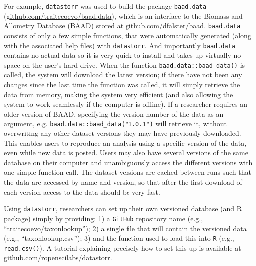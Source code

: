 \documentclass[a4paper,11pt]{article}
\newcommand{\smurl}[1]{{\footnotesize\url{#1}}}
\begin{document}
For example, \texttt{datastorr} was used to build the package \texttt{baad.data} (\smurl{github.com/traitecoevo/baad.data}), which is an interface to the Biomass and Allometry Database (\textsc{BAAD}) \citep{Falster-2015} stored at \smurl{github.com/dfalster/baad}. \texttt{baad.data} consists of only a few simple functions, that were automatically generated (along with the associated help files) with \texttt{datastorr}. And importantly \texttt{baad.data} contains no actual data so it is very quick to install and takes up virtually no space on the user's hard-drive.
When the function \texttt{baad.data::baad\_data()} is called, the system will download the latest version; if there have not been any changes since the last time the function was called, it will simply retrieve the data from memory, making the system very efficient (and also allowing the system to work seamlessly if the computer is offline). If a researcher requires an older version of \textsc{BAAD}, specifying the version number of the data as an argument, e.g. \texttt{baad.data::baad\_data("1.0.1")} will retrieve it, without overwriting any other dataset versions they may have previously downloaded. This enables users to reproduce an analysis using a specific version of the data, even while new data is posted.  Users may also have several versions of the same database on their computer and unambiguously access the different versions with one simple function call. The dataset versions are cached between runs such that the data are accessed by name and version, so that after the first download of each version access to the data should be very fast.  


Using \texttt{datastorr}, researchers can set up their own versioned database (and R package) simply by providing: 1) a \texttt{GitHub} repository name (e.g., ``traitecoevo/taxonlookup''); 2) a single file that will contain the versioned data (e.g., ``taxonlookup.csv''); 3) and the function used to load this into \texttt{R} (e.g., \texttt{read.csv()}). A tutorial explaining precisely how to set this up is available at \smurl{github.com/ropenscilabs/datastorr}.
\end{document}
